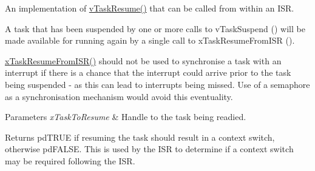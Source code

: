 An implementation of \hyperlink{externals_2freertos_2include_2task_8h_a84a1584f29fb7736a1aa72ad5b3e9b44}{v\+Task\+Resume()} that can be called from within an I\+SR.

A task that has been suspended by one or more calls to v\+Task\+Suspend () will be made available for running again by a single call to x\+Task\+Resume\+From\+I\+SR ().

\hyperlink{externals_2freertos_2include_2task_8h_aefbfd37c0661c3062fafd7334bff9aed}{x\+Task\+Resume\+From\+I\+S\+R()} should not be used to synchronise a task with an interrupt if there is a chance that the interrupt could arrive prior to the task being suspended -\/ as this can lead to interrupts being missed. Use of a semaphore as a synchronisation mechanism would avoid this eventuality.


\begin{DoxyParams}{Parameters}
{\em x\+Task\+To\+Resume} & Handle to the task being readied.\\
\hline
\end{DoxyParams}
\begin{DoxyReturn}{Returns}
pd\+T\+R\+UE if resuming the task should result in a context switch, otherwise pd\+F\+A\+L\+SE. This is used by the I\+SR to determine if a context switch may be required following the I\+SR. 
\end{DoxyReturn}
